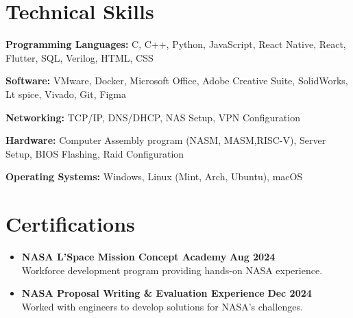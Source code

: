 \documentclass[letterpaper,11pt]{article}
\begin{document}
\section{Technical Skills}
\begin{itemize}[left=0.15in, label={}]
    \small{
    \item \textbf{Programming Languages:} C, C++, Python, JavaScript, React Native, React, Flutter, SQL, Verilog, HTML, CSS
    \item \textbf{Software:} VMware, Docker, Microsoft Office, Adobe Creative Suite, SolidWorks, Lt spice, Vivado, Git, Figma
    \item \textbf{Networking:} TCP/IP, DNS/DHCP, NAS Setup, VPN Configuration
    \item \textbf{Hardware:} Computer Assembly program (NASM, MASM,RISC-V), Server Setup, BIOS Flashing, Raid Configuration
    \item \textbf{Operating Systems:} Windows, Linux (Mint, Arch, Ubuntu), macOS
    }
\end{itemize}

\section{Certifications}
\begin{itemize}[leftmargin=0.15in, label={}]
    \item \textbf{NASA L’Space Mission Concept Academy} \hfill \textbf{Aug 2024} \\
    Workforce development program providing hands-on NASA experience. \\

    \item \textbf{NASA Proposal Writing \& Evaluation Experience} \hfill \textbf{Dec 2024} \\ 
    Worked with engineers to develop solutions for NASA’s challenges.
\end{itemize}
\end{document}
